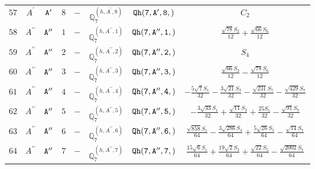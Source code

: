 \documentclass[fleqn,8pt]{jsarticle}
\begin{document}
\begin{table}[ht!]
\begin{center}
\begin{tabular}{cccccccc}
$ 57 $ & $ A^{\prime} $ & $ {\tt A'} $ & $ 8 $ & $ - $ & $ \mathbb{Q}_{7}^{(h,A^{\prime},8)} $ & $ {\tt Qh(7,A',8,)} $ & $ C_{2} $ \\
$ 58 $ & $ A^{\prime\prime} $ & $ {\tt A''} $ & $ 1 $ & $ - $ & $ \mathbb{Q}_{7}^{(h,A^{\prime\prime},1)} $ & $ {\tt Qh(7,A'',1,)} $ & $ \frac{\sqrt{78} S_{2}}{12} + \frac{\sqrt{66} S_{6}}{12} $ \\
$ 59 $ & $ A^{\prime\prime} $ & $ {\tt A''} $ & $ 2 $ & $ - $ & $ \mathbb{Q}_{7}^{(h,A^{\prime\prime},2)} $ & $ {\tt Qh(7,A'',2,)} $ & $ S_{4} $ \\
$ 60 $ & $ A^{\prime\prime} $ & $ {\tt A''} $ & $ 3 $ & $ - $ & $ \mathbb{Q}_{7}^{(h,A^{\prime\prime},3)} $ & $ {\tt Qh(7,A'',3,)} $ & $ \frac{\sqrt{66} S_{2}}{12} - \frac{\sqrt{78} S_{6}}{12} $ \\
$ 61 $ & $ A^{\prime\prime} $ & $ {\tt A''} $ & $ 4 $ & $ - $ & $ \mathbb{Q}_{7}^{(h,A^{\prime\prime},4)} $ & $ {\tt Qh(7,A'',4,)} $ & $ - \frac{5 \sqrt{7} S_{1}}{32} - \frac{3 \sqrt{21} S_{3}}{32} - \frac{\sqrt{231} S_{5}}{32} - \frac{\sqrt{429} S_{7}}{32} $ \\
$ 62 $ & $ A^{\prime\prime} $ & $ {\tt A''} $ & $ 5 $ & $ - $ & $ \mathbb{Q}_{7}^{(h,A^{\prime\prime},5)} $ & $ {\tt Qh(7,A'',5,)} $ & $ - \frac{3 \sqrt{33} S_{1}}{32} + \frac{\sqrt{11} S_{3}}{32} + \frac{25 S_{5}}{32} - \frac{\sqrt{91} S_{7}}{32} $ \\
$ 63 $ & $ A^{\prime\prime} $ & $ {\tt A''} $ & $ 6 $ & $ - $ & $ \mathbb{Q}_{7}^{(h,A^{\prime\prime},6)} $ & $ {\tt Qh(7,A'',6,)} $ & $ \frac{\sqrt{858} S_{1}}{64} - \frac{3 \sqrt{286} S_{3}}{64} + \frac{5 \sqrt{26} S_{5}}{64} - \frac{\sqrt{14} S_{7}}{64} $ \\
$ 64 $ & $ A^{\prime\prime} $ & $ {\tt A''} $ & $ 7 $ & $ - $ & $ \mathbb{Q}_{7}^{(h,A^{\prime\prime},7)} $ & $ {\tt Qh(7,A'',7,)} $ & $ \frac{15 \sqrt{6} S_{1}}{64} + \frac{19 \sqrt{2} S_{3}}{64} + \frac{\sqrt{22} S_{5}}{64} - \frac{\sqrt{2002} S_{7}}{64} $ \\
 \hline \hline
\end{tabular}
\end{center}
\end{table}
\end{document}
